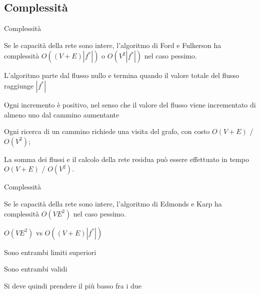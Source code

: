 \subsection{Complessità}


\begin{frame}{Complessità}

\vspace{-9pt}
\begin{myboxtitle}
Se le capacità della rete sono intere, l'algoritmo di Ford e Fulkerson
ha complessità $O((V+E)|f^*|)$ o $O(V^2|f^*|)$ nel caso pessimo.
\end{myboxtitle}

\BIL
\item L'algoritmo parte dal flusso nullo e termina quando il valore totale
del flusso raggiunge $|f^*|$
\item Ogni incremento è positivo, nel senso che il valore del flusso viene 
incrementato di almeno uno dal cammino aumentante
\item Ogni ricerca di un cammino richiede una visita del grafo, con
costo $O(V+E)$ / $O(V^2)$; 
\item La somma dei flussi e il calcolo della rete residua può essere 
effettuato in tempo $O(V+E)$ / $O(V^2)$.
\EIL

\end{frame}

\begin{frame}{Complessità}

\vspace{-9pt}
\begin{myboxtitle}
Se le capacità della rete sono intere, l'algoritmo di Edmonds e Karp
ha complessità $O(VE^2)$ nel caso pessimo.
\end{myboxtitle}


\BIL
\item $O(VE^2)$ vs $O((V+E)|f^*|)$
\item Sono entrambi limiti superiori
\item Sono entrambi validi
\item Si deve quindi prendere il più basso fra i due
\EIL

\end{frame}

